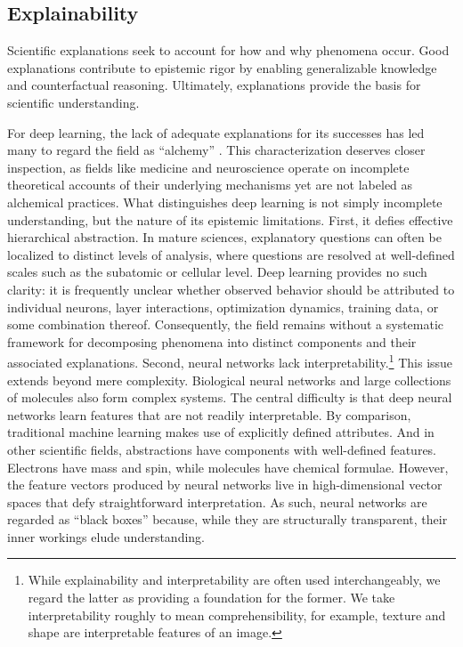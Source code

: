 \documentclass{article}
\begin{document}
\subsection{Explainability}

Scientific explanations seek to account for how and why phenomena occur.
Good explanations contribute to epistemic rigor by enabling generalizable knowledge and counterfactual reasoning.
Ultimately, explanations provide the basis for scientific understanding.

For deep learning, the lack of adequate explanations for its successes has led many to regard the field as ``alchemy'' \cite{Hutson2018AIAlchemy, Arora2019AlchemyControversy, Kolter2024AlchemyNeurIPS}.
This characterization deserves closer inspection, as fields like medicine and neuroscience operate on incomplete theoretical accounts of their underlying mechanisms yet are not labeled as alchemical practices.
What distinguishes deep learning is not simply incomplete understanding, but the nature of its epistemic limitations.
First, it defies effective hierarchical abstraction.
In mature sciences, explanatory questions can often be localized to distinct levels of analysis, where questions are resolved at well-defined scales such as the subatomic or cellular level.
Deep learning provides no such clarity: it is frequently unclear whether observed behavior should be attributed to individual neurons, layer interactions, optimization dynamics, training data, or some combination thereof.
Consequently, the field remains without a systematic framework for decomposing phenomena into distinct components and their associated explanations.
Second, neural networks lack interpretability.\footnote{While explainability and interpretability are often used interchangeably, we regard the latter as providing a foundation for the former. We take interpretability roughly to mean comprehensibility, for example, texture and shape are interpretable features of an image.}
This issue extends beyond mere complexity.
Biological neural networks and large collections of molecules also form complex systems.
The central difficulty is that deep neural networks learn features that are not readily interpretable.
By comparison, traditional machine learning makes use of explicitly defined attributes.
And in other scientific fields, abstractions have components with well-defined features.
Electrons have mass and spin, while molecules have chemical formulae.
However, the feature vectors produced by neural networks live in high-dimensional vector spaces that defy straightforward interpretation.
As such, neural networks are regarded as ``black boxes'' because, while they are structurally transparent, their inner workings elude understanding.
\end{document}
